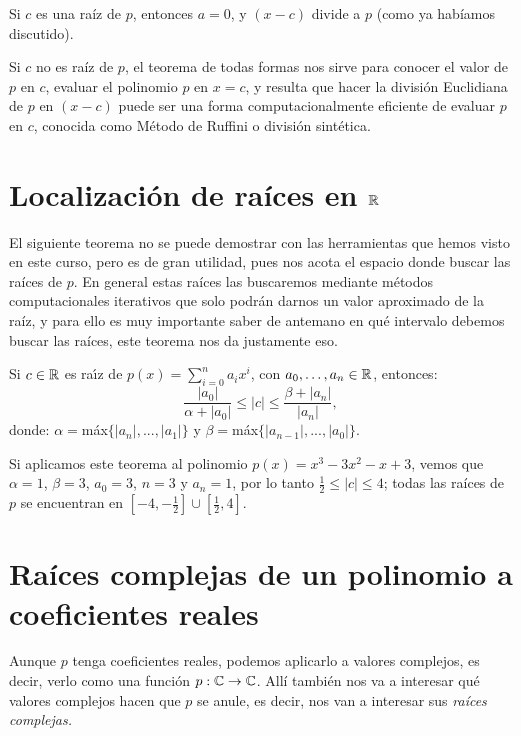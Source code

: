 Si $c$ es una raíz de $p$, entonces $a=0$, y $(x-c)$ divide a $p$ (como ya habíamos discutido).

Si $c$ no es raíz de $p$, el teorema de todas formas nos sirve para conocer el valor de $p$ en $c$, evaluar el polinomio $p$ en $x=c$, y resulta que hacer la división Euclidiana de $p$ en $(x-c)$ puede ser una forma computacionalmente eficiente de evaluar $p$ en $c$, conocida como Método de Ruffini o división sintética.

\section{Localización de raíces en $\mathbb{R}$}

El siguiente teorema no se puede demostrar con las herramientas que hemos visto en este curso, pero es de gran utilidad, pues nos acota el espacio donde buscar las raíces de $p$.
En general estas raíces las buscaremos mediante métodos computacionales iterativos que solo podrán darnos un valor aproximado de la raíz, y para ello es muy importante saber de antemano en qué intervalo debemos buscar las raíces, este teorema nos da justamente eso.

\begin{thm}
Si $c\in \mathbb{R}$ es ra{\'\i}z de $\displaystyle p(x)=\sum_{i=0}^n a_ix^i$, con $a_0,\dots,a_n\in\mathbb{R}$, entonces:
$$\frac{|a_0|}{\alpha+|a_0|}\le |c|\le \frac{\beta+|a_n|}{|a_n|},$$
donde:
$\alpha=$m\'ax$\{|a_n|,...,|a_1|\}$ y $\beta=$m\'ax$\{|a_{n-1}|,...,|a_0|\}$.
\end{thm}

\medskip

\begin{ejemplo}
Si aplicamos este teorema al polinomio $p(x)=x^3-3x^2-x+3$, vemos que $\alpha=1$, $\beta=3$, $a_0=3$, $n=3$ y $a_n=1$, por lo tanto  $\frac{1}{2} \le |c| \le 4$; todas las raíces de $p$ se encuentran en $[-4,-\frac{1}{2}]\cup[\frac{1}{2},4]$.
\end{ejemplo}



\section{Raíces complejas de un polinomio a coeficientes reales}

Aunque $p$ tenga coeficientes reales, podemos aplicarlo a valores complejos, es decir, verlo como una función $p:\mathbb{C}\rightarrow \mathbb{C}$.
Allí también nos va a interesar qué valores complejos hacen que $p$ se anule, es decir, nos van a interesar sus \emph{raíces complejas.}

